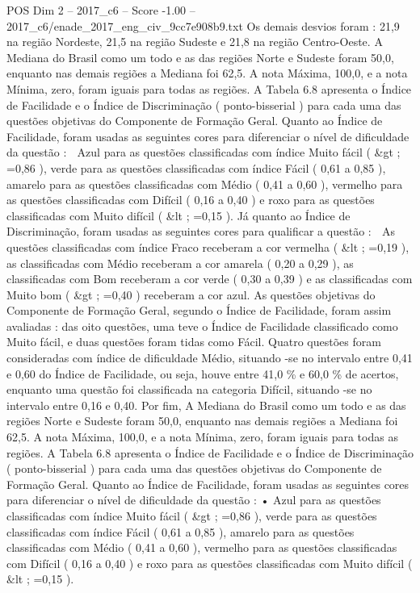 \begin{textsample}{POS Dim 2 – 2017\_c6 – Score -1.00 – 2017\_c6/enade\_2017\_eng\_civ\_9cc7e908b9.txt}
Os demais desvios foram : 21,9 na região Nordeste, 21,5 na região Sudeste e 21,8 na região Centro-Oeste.
A Mediana do Brasil como um todo e as das regiões Norte e Sudeste foram 50,0, enquanto nas demais regiões a Mediana foi 62,5.
A nota Máxima, 100,0, e a nota Mínima, zero, foram iguais para todas as regiões.
A Tabela 6.8 apresenta o Índice de Facilidade e o Índice de Discriminação ( ponto-bisserial ) para cada uma das questões objetivas do Componente de Formação Geral.
Quanto ao Índice de Facilidade, foram usadas as seguintes cores para diferenciar o nível de dificuldade da questão :  Azul para as questões classificadas com índice Muito fácil ( \&gt ; =0,86 ), verde para as questões classificadas com índice Fácil ( 0,61 a 0,85 ), amarelo para as questões classificadas com Médio ( 0,41 a 0,60 ), vermelho para as questões classificadas com Difícil ( 0,16 a 0,40 ) e roxo para as questões classificadas com Muito difícil ( \&lt ; =0,15 ).
Já quanto ao Índice de Discriminação, foram usadas as seguintes cores para qualificar a questão :  As questões classificadas com índice Fraco receberam a cor vermelha ( \&lt ; =0,19 ), as classificadas com Médio receberam a cor amarela ( 0,20 a 0,29 ), as classificadas com Bom receberam a cor verde ( 0,30 a 0,39 ) e as classificadas com Muito bom ( \&gt ; =0,40 ) receberam a cor azul.
As questões objetivas do Componente de Formação Geral, segundo o Índice de Facilidade, foram assim avaliadas : das oito questões, uma teve o Índice de Facilidade classificado como Muito fácil, e duas questões foram tidas como Fácil.
Quatro questões foram consideradas com índice de dificuldade Médio, situando -se no intervalo entre 0,41 e 0,60 do Índice de Facilidade, ou seja, houve entre 41,0 \% e 60,0 \% de acertos, enquanto uma questão foi classificada na categoria Difícil, situando -se no intervalo entre 0,16 e 0,40.
Por fim, A Mediana do Brasil como um todo e as das regiões Norte e Sudeste foram 50,0, enquanto nas demais regiões a Mediana foi 62,5.
A nota Máxima, 100,0, e a nota Mínima, zero, foram iguais para todas as regiões.
A Tabela 6.8 apresenta o Índice de Facilidade e o Índice de Discriminação ( ponto-bisserial ) para cada uma das questões objetivas do Componente de Formação Geral.
Quanto ao Índice de Facilidade, foram usadas as seguintes cores para diferenciar o nível de dificuldade da questão : • Azul para as questões classificadas com índice Muito fácil ( \&gt ; =0,86 ), verde para as questões classificadas com índice Fácil ( 0,61 a 0,85 ), amarelo para as questões classificadas com Médio ( 0,41 a 0,60 ), vermelho para as questões classificadas com Difícil ( 0,16 a 0,40 ) e roxo para as questões classificadas com Muito difícil ( \&lt ; =0,15 ).

\end{textsample}
